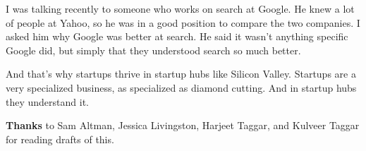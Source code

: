 I was talking recently to someone who works on search at Google. He knew
a lot of people at Yahoo, so he was in a good position to compare the
two companies. I asked him why Google was better at search. He said it
wasn't anything specific Google did, but simply that they understood
search so much better.

And that's why startups thrive in startup hubs like Silicon Valley.
Startups are a very specialized business, as specialized as diamond
cutting. And in startup hubs they understand it.


\textbf{Thanks} to Sam Altman, Jessica Livingston, Harjeet Taggar, and
Kulveer Taggar for reading drafts of this.